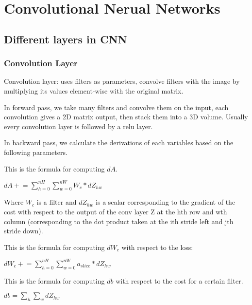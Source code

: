 \documentclass{article}
\begin{document}
\section{Convolutional Nerual Networks}
	\subsection{Different layers in CNN}
		\subsubsection{Convolution Layer}
			\begin{flushleft}
				Convolution layer: uses filters as parameters, convolve filters with the image by multiplying its values element-wise with the original matrix.
			\end{flushleft}
			\begin{flushleft}
				In forward pass, we take many filters and convolve them on the input, each convolution gives a 2D matrix output, then stack them into a 3D volume. Usually every convolution layer is followed by a relu layer.
			\end{flushleft}
			\begin{flushleft}
				In backward pass, we calculate the derivations of each variables based on the following parameters.
			\end{flushleft}
				This is the formula for computing $dA$.
			\begin{center}
				$dA \mathrel{+}= \sum_{h=0}^{nH} \sum_{w=0}^{nW} W_c * dZ_{hw}$
			\end{center}
			\begin{flushleft}
				Where $W_c$ is a filter and $dZ_{hw}$ is a scalar corresponding to the gradient of the cost with respect to the output of the conv layer Z at the hth row and wth column (corresponding to the dot product taken at the ith stride left and jth stride down).	
			\end{flushleft}
			\begin{flushleft}
				This is the formula for computing $dW_c$ with respect to the loss:
			\end{flushleft}
			\begin{center}
				$dW_c \mathrel{+}= \sum_{h=0}^{nH}\sum_{w=0}^{nW} a_{slice}*dZ_{hw}$ 
			\end{center}
			\begin{flushleft}
				This is the formula for computing $db$ with respect to the cost for a certain filter.
			\end{flushleft}
			\begin{center}
				$db = \sum_h \sum_w dZ_{hw}$
			\end{center}
\end{document}
